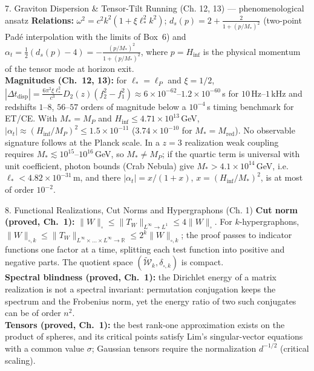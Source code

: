 \documentclass[11pt,a4paper,oneside]{article}
\begin{document}
\begin{conceptbox}{{7. Graviton Dispersion \& Tensor-Tilt Running (Ch. 12, 13) --- phenomenological ansatz}}
\textbf{Relations:} $\omega^2 = c^2 k^2 (1 + \xi \ell_\ast^2 k^2)$; $d_s(p) = 2 + \frac{2}{1 + (p/M_\ast)^2}$ (two-point Pad\'e interpolation with the limits of Box~6) and $\alpha_t = \frac{1}{2}(d_s(p) - 4) = -\frac{(p/M_\ast)^2}{1 + (p/M_\ast)^2}$, where $p = H_{\mathrm{inf}}$ is the physical momentum of the tensor mode at horizon exit.\\
\textbf{Magnitudes (Ch.~12, 13):} for $\ell_\ast = \ell_P$ and $\xi = 1/2$, $|\Delta t_{\mathrm{disp}}| = \frac{6\pi^2 \xi \ell_\ast^2}{c^3} D_2(z) (f_2^2 - f_1^2) \approx 6 \times 10^{-62}$--$1.2 \times 10^{-60}$\,s for $10$\,Hz--$1$\,kHz and redshifts $1$--$8$, $56$--$57$ orders of magnitude below a $10^{-4}$\,s timing benchmark for ET/CE. With $M_\ast = M_P$ and $H_{\mathrm{inf}} \le 4.71 \times 10^{13}$\,GeV, $|\alpha_t| \approx (H_{\mathrm{inf}}/M_P)^2 \le 1.5 \times 10^{-11}$ ($3.74 \times 10^{-10}$ for $M_\ast = M_{\mathrm{red}}$). No observable signature follows at the Planck scale. In a $z = 3$ realization weak coupling requires $M_\ast \lesssim 10^{15}$--$10^{16}$\,GeV, so $M_\ast \ne M_P$; if the quartic term is universal with unit coefficient, photon bounds (Crab Nebula) give $M_\ast > 4.1 \times 10^{14}$\,GeV, i.e.\ $\ell_\ast < 4.82 \times 10^{-31}$\,m, and there $|\alpha_t| = x/(1+x)$, $x = (H_{\mathrm{inf}}/M_\ast)^2$, is at most of order $10^{-2}$.
\end{conceptbox}

\begin{conceptbox}{{8. Functional Realizations, Cut Norms and Hypergraphons (Ch. 1)}}
\textbf{Cut norm (proved, Ch.~1):} $\|W\|_\square \le \|T_W\|_{L^\infty \to L^1} \le 4\|W\|_\square$. For $k$-hypergraphons, $\|W\|_{\square,k} \le \|T_W\|_{L^\infty \times \dots \times L^\infty \to \mathbb{R}} \le 2^k\|W\|_{\square,k}$; the proof passes to indicator functions one factor at a time, splitting each test function into positive and negative parts. The quotient space $(\widetilde{\mathcal{W}}_k, \delta_{\square,k})$ is compact.\\
\textbf{Spectral blindness (proved, Ch.~1):} the Dirichlet energy of a matrix realization is not a spectral invariant: permutation conjugation keeps the spectrum and the Frobenius norm, yet the energy ratio of two such conjugates can be of order $n^2$.\\
\textbf{Tensors (proved, Ch.~1):} the best rank-one approximation exists on the product of spheres, and its critical points satisfy Lim's singular-vector equations with a common value $\sigma$; Gaussian tensors require the normalization $d^{-1/2}$ (critical scaling).
\end{conceptbox}
\end{document}

